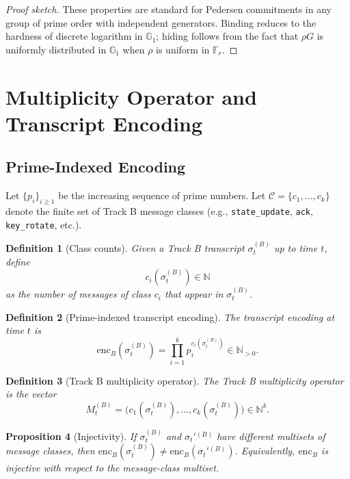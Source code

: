 \documentclass[11pt]{article}
\newtheorem{definition}{Definition}[section]
\newtheorem{proposition}[definition]{Proposition}
\newcommand{\N}{\mathbb{N}}
\newcommand{\F}{\mathbb{F}}
\newcommand{\G}{\mathbb{G}}
\begin{document}
\begin{proof}[Proof sketch]
These properties are standard for Pedersen commitments in any group of prime order with independent generators.\cite{PedersenZKDocs,PedersenRareSkills,PedersenLibby,PedersenLibbitcoin}
Binding reduces to the hardness of discrete logarithm in \(\G_1\); hiding follows from the fact that \(\rho G\) is uniformly distributed in \(\G_1\) when \(\rho\) is uniform in \(\F_r\).
\end{proof}

\section{Multiplicity Operator and Transcript Encoding}

\subsection{Prime-Indexed Encoding}

Let \(\{p_i\}_{i \ge 1}\) be the increasing sequence of prime numbers.
Let \(\mathcal{C} = \{c_1,\dots,c_k\}\) denote the finite set of Track B message classes (e.g., \texttt{state\_update}, \texttt{ack}, \texttt{key\_rotate}, etc.).

\begin{definition}[Class counts]
Given a Track B transcript \(\sigma_t^{(B)}\) up to time \(t\), define
\[
  c_i(\sigma_t^{(B)}) \in \N
\]
as the number of messages of class \(c_i\) that appear in \(\sigma_t^{(B)}\).
\end{definition}

\begin{definition}[Prime-indexed transcript encoding]
The transcript encoding at time \(t\) is
\[
  \mathrm{enc}_B(\sigma_t^{(B)}) = \prod_{i=1}^k p_i^{c_i(\sigma_t^{(B)})} \in \N_{>0}.
\]
\end{definition}

\begin{definition}[Track B multiplicity operator]
The Track B multiplicity operator is the vector
\[
  M_t^{(B)} = \bigl(c_1(\sigma_t^{(B)}), \dots, c_k(\sigma_t^{(B)})\bigr) \in \N^k.
\]
\end{definition}

\begin{proposition}[Injectivity]
If \(\sigma_t^{(B)}\) and \(\sigma_t'{}^{(B)}\) have different multisets of message classes, then
\(\mathrm{enc}_B(\sigma_t^{(B)}) \ne \mathrm{enc}_B(\sigma_t'{}^{(B)})\).
Equivalently, \(\mathrm{enc}_B\) is injective with respect to the message-class multiset.
\end{proposition}
\end{document}
